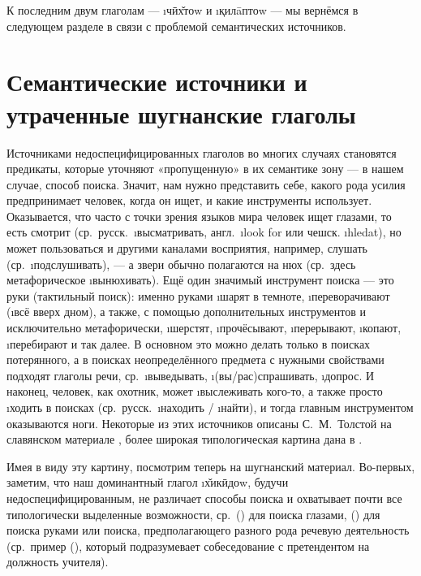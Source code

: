 К последним двум глаголам — \i{чӣх̌тоw} и \i{қилāптоw} — мы вернёмся в следующем разделе в связи с проблемой семантических источников.

\section{Семантические источники  и утраченные шугнанские глаголы} \label{search-sources}

Источниками недоспецифицированных глаголов во многих случаях становятся предикаты, которые уточняют «пропущенную» в их семантике зону — в нашем случае, способ поиска. Значит, нам нужно представить себе, какого рода усилия предпринимает человек, когда он ищет, и какие инструменты использует. Оказывается, что часто с точки зрения языков мира человек ищет глазами, то есть смотрит (ср.~русск.~\i{высматривать}, англ.~\i{look for} или чешск. \i{hledat}), но может пользоваться и другими каналами восприятия, например, слушать (ср.~\i{подслушивать}), — а звери обычно полагаются на нюх (ср.~здесь метафорическое \i{вынюхивать}). Ещё один значимый инструмент поиска — это руки (тактильный поиск): именно руками \i{шарят} в темноте, \i{переворачивают} (\i{всё вверх дном}), а также, с помощью дополнительных инструментов и исключительно метафорически, \i{шерстят}, \i{прочёсывают}, \i{перерывают}, \i{копают}, \i{перебирают} и так далее. В основном это можно делать только в поисках потерянного, а в поисках неопределённого предмета с нужными свойствами подходят глаголы речи, ср.~\i{выведывать}, \i{(вы/рас)спрашивать}, \i{допрос}. И наконец, человек, как охотник, может \i{выслеживать кого-то}, а также просто \i{ходить в поисках} (ср.~русск.~\i{находить} / \i{найти}), и тогда главным инструментом оказываются ноги. Некоторые из этих источников описаны С.~М.~Толстой на славянском материале \parencite{tolstaya2013}, более широкая типологическая картина дана в \parencite{eureka2018}.

Имея в виду эту картину, посмотрим теперь на шугнанский материал. Во-первых, заметим, что наш доминантный глагол \i{х̌икӣдоw}, будучи недоспецифицированным, не различает способы поиска и охватывает почти все типологически выделенные возможности, ср.~() для поиска глазами, () для поиска руками или поиска, предполагающего разного рода речевую деятельность (ср.~пример (), который подразумевает собеседование с претендентом на должность учителя).

